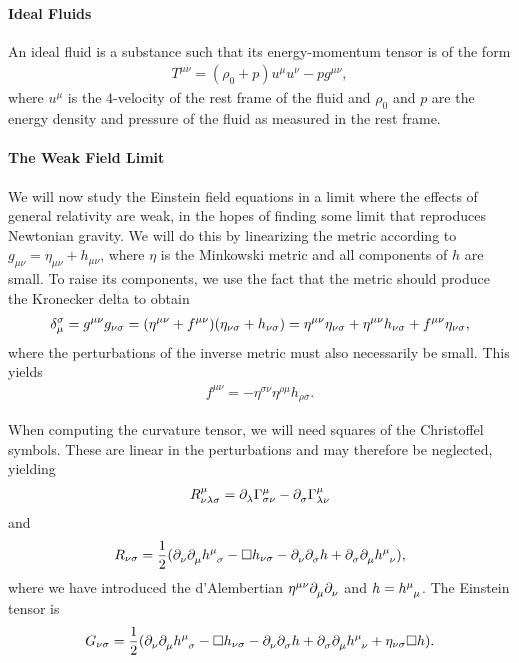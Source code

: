 \paragraph{Ideal Fluids}
An ideal fluid is a substance such that its energy-momentum tensor is of the form
\begin{align*}
	T^{\mu\nu} = (\rho_{0} + p)u^{\mu}u^{\nu} - pg^{\mu\nu},
\end{align*}
where $u^{\mu}$ is the $4$-velocity of the rest frame of the fluid and $\rho_{0}$ and $p$ are the energy density and pressure of the fluid as measured in the rest frame.

\paragraph{The Weak Field Limit}
We will now study the Einstein field equations in a limit where the effects of general relativity are weak, in the hopes of finding some limit that reproduces Newtonian gravity. We will do this by linearizing the metric according to $g_{\mu\nu} = \eta_{\mu\nu} + h_{\mu\nu}$, where $\eta$ is the Minkowski metric and all components of $h$ are small. To raise its components, we use the fact that the metric should produce the Kronecker delta to obtain
\begin{align*}
	\kdelta{\mu}{\sigma} = g^{\mu\nu}g_{\nu\sigma} = (\eta^{\mu\nu} + f^{\mu\nu})(\eta_{\nu\sigma} + h_{\nu\sigma}) = \eta^{\mu\nu}\eta_{\nu\sigma} + \eta^{\mu\nu}h_{\nu\sigma} + f^{\mu\nu}\eta_{\nu\sigma},
\end{align*}
where the perturbations of the inverse metric must also necessarily be small. This yields
\begin{align*}
	f^{\mu\nu} = -\eta^{\sigma\nu}\eta^{\rho\mu}h_{\rho\sigma}.
\end{align*}

When computing the curvature tensor, we will need squares of the Christoffel symbols. These are linear in the perturbations and may therefore be neglected, yielding
\begin{align*}
	\tensor*{R}{^{\mu}_{\nu\lambda\sigma}} = \del{\lambda}{\chris{\mu}{\sigma}{\nu}} - \del{\sigma}{\chris{\mu}{\lambda}{\nu}}
\end{align*}
and
\begin{align*}
	R_{\nu\sigma} = \frac{1}{2}(\del{\nu}{\del{\mu}{\tensor{h}{^{\mu}_{\sigma}}}} - \square h_{\nu\sigma} - \del{\nu}{\del{\sigma}{h}} + \del{\sigma}{\del{\mu}{\tensor{h}{^{\mu}_{\nu}}}}),
\end{align*}
where we have introduced the d'Alembertian $\eta^{\mu\nu}\partial^{}_{\mu}\partial^{}_{\nu}$ and $h = \tensor{h}{^{\mu}_{\mu}}$. The Einstein tensor is
\begin{align*}
	G_{\nu\sigma} = \frac{1}{2}(\del{\nu}{\del{\mu}{\tensor{h}{^{\mu}_{\sigma}}}} - \square h_{\nu\sigma} - \del{\nu}{\del{\sigma}{h}} + \del{\sigma}{\del{\mu}{\tensor{h}{^{\mu}_{\nu}}}} + \eta_{\nu\sigma}\square h).
\end{align*}

